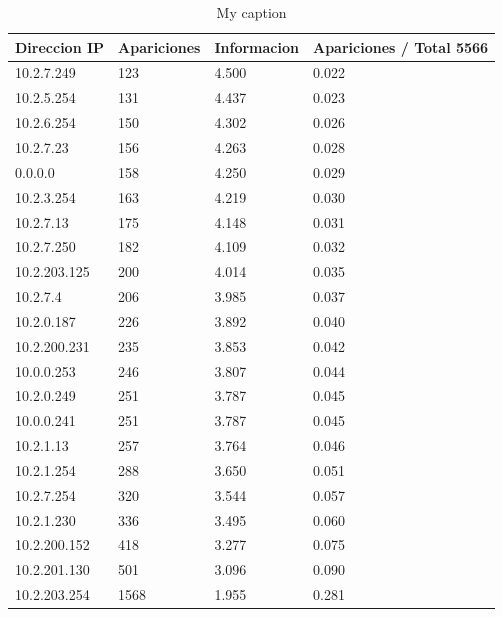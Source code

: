 \begin{table}[H]
\centering
\caption{My caption}
\label{my-label}
\begin{tabular}{@{}llll@{}}
\toprule
Direccion IP & Apariciones & Informacion        & Apariciones / Total 5566 \\ \midrule
10.2.7.249   & 123         & 4.500              & 0.022                    \\
10.2.5.254   & 131         & 4.437              & 0.023                    \\
10.2.6.254   & 150         & 4.302              & 0.026                    \\
10.2.7.23    & 156         & 4.263              & 0.028                    \\
0.0.0.0      & 158         & 4.250              & 0.029                    \\
10.2.3.254   & 163         & 4.219              & 0.030                    \\
10.2.7.13    & 175         & 4.148              & 0.031                    \\
10.2.7.250   & 182         & 4.109              & 0.032                    \\
10.2.203.125 & 200         & 4.014              & 0.035                    \\
10.2.7.4     & 206         & 3.985              & 0.037                    \\
10.2.0.187   & 226         & 3.892              & 0.040                    \\
10.2.200.231 & 235         & 3.853              & 0.042                    \\
10.0.0.253   & 246         & 3.807              & 0.044                    \\
10.2.0.249   & 251         & 3.787              & 0.045                    \\
10.0.0.241   & 251         & 3.787              & 0.045                    \\
10.2.1.13    & 257         & 3.764              & 0.046                    \\
10.2.1.254   & 288         & 3.650              & 0.051                    \\
10.2.7.254   & 320         & 3.544              & 0.057                    \\
10.2.1.230   & 336         & 3.495              & 0.060                    \\
10.2.200.152 & 418         & 3.277              & 0.075                    \\
10.2.201.130 & 501         & 3.096              & 0.090                    \\
10.2.203.254 & 1568        & 1.955              & 0.281                    \\ \bottomrule
\end{tabular}
\end{table}


